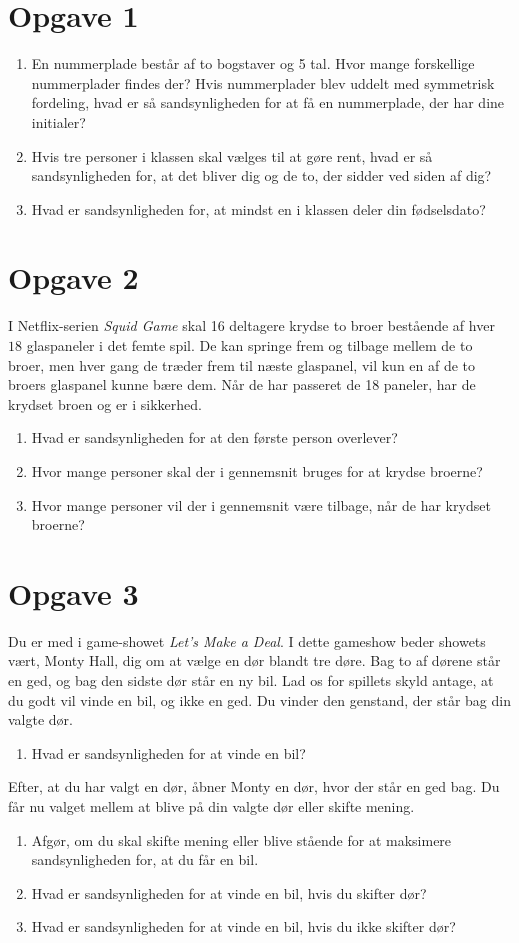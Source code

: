 \section*{Opgave 1}
\begin{enumerate}[label=\roman*)]
\item En nummerplade består af to bogstaver og 5 tal. Hvor mange forskellige nummerplader findes der? Hvis nummerplader blev uddelt med symmetrisk fordeling, hvad er så sandsynligheden for at få en nummerplade, der har dine initialer?
\item Hvis tre personer i klassen skal vælges til at gøre rent, hvad er så sandsynligheden for, at det bliver dig og de to, der sidder ved siden af dig?
\item Hvad er sandsynligheden for, at mindst en i klassen deler din fødselsdato?
\end{enumerate}
\section*{Opgave 2}
I Netflix-serien \textit{Squid Game} skal 16 deltagere krydse to broer bestående af hver $18$ glaspaneler i det femte spil. De kan springe frem og tilbage mellem de to broer, men hver gang de træder frem til næste glaspanel, vil kun en af de to broers glaspanel kunne bære dem. Når de har passeret de 18 paneler, har de krydset broen og er i sikkerhed.
\begin{enumerate}[label=\roman*)]
\item Hvad er sandsynligheden for at den første person overlever?
\item Hvor mange personer skal der i gennemsnit bruges for at krydse broerne? 
\item Hvor mange personer vil der i gennemsnit være tilbage, når de har krydset broerne?
\end{enumerate}

\section*{Opgave 3}
Du er med i game-showet \textit{Let's Make a Deal}. I dette gameshow beder showets vært, Monty Hall, dig om at vælge en dør blandt tre døre. Bag to af dørene står en ged, og bag den sidste dør står en ny bil. Lad os for spillets skyld antage, at du godt vil vinde en bil, og ikke en ged. Du vinder den genstand, der står bag din valgte dør. 
\begin{enumerate}[label=\roman*)]
\item Hvad er sandsynligheden for at vinde en bil?
\end{enumerate}
Efter, at du har valgt en dør, åbner Monty en dør, hvor der står en ged bag. Du får nu valget mellem at blive på din valgte dør eller skifte mening.
\begin{enumerate}[label=\roman*)]
\item Afgør, om du skal skifte mening eller blive stående for at maksimere sandsynligheden for, at du får en bil.
\item Hvad er sandsynligheden for at vinde en bil, hvis du skifter dør?
\item Hvad er sandsynligheden for at vinde en bil, hvis du ikke skifter dør?
\end{enumerate}
